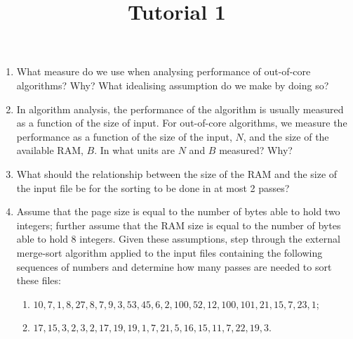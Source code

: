 \documentclass[12pt]{article}
\begin{document}
\title{Tutorial 1}
\date{}
\maketitle

\begin{enumerate}
\item What measure do we use when analysing performance of out-of-core
  algorithms? Why? What idealising assumption do we make by doing so?
  
\item In algorithm analysis, the performance of the algorithm is
  usually measured as a function of the size of input.  For
  out-of-core algorithms, we measure the performance as a function of
  the size of the input, $N$, and the size of the available RAM, $B$.
  In what units are $N$ and $B$ measured? Why?
  
\item What should the relationship between the size of the RAM and the
  size of the input file be for the sorting to be done in at most 2
  passes? 
  
\item Assume that the page size is equal to the number of bytes able
  to hold two integers; further assume that the RAM size is equal to
  the number of bytes able to hold 8 integers.  Given these
  assumptions, step through the external merge-sort algorithm applied
  to the input files containing the following sequences of numbers and
  determine how many passes are needed to sort these files:
  
  \begin{enumerate}[label=(\roman*)]
    \item $10, 7, 1, 8, 27, 8, 7, 9, 3, 53, 45, 6, 2, 100, 52, 12, 100,
      101, 21, 15, 7, 23, 1$;
    \item $17, 15, 3, 2, 3, 2, 17, 19, 19, 1, 7, 21, 5, 16, 15, 11, 7,
      22, 19, 3$.
    \end{enumerate}


\end{enumerate}
\end{document}
